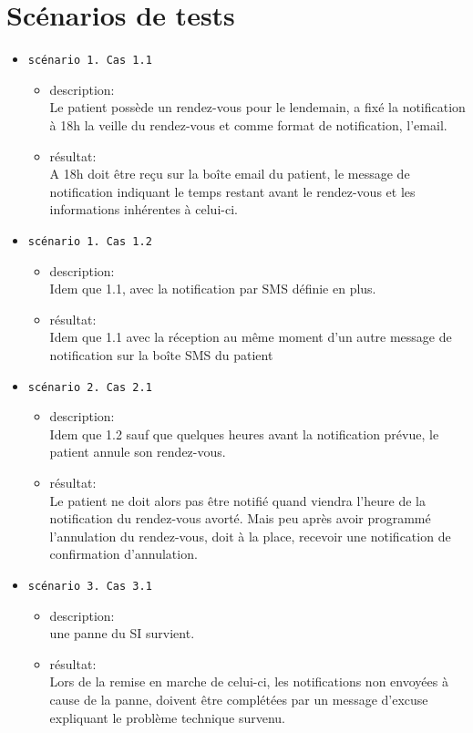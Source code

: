 	\section{Scénarios de tests}
	\begin{itemize}
		\item[] \texttt{scénario 1. Cas 1.1}
			\begin{itemize}
				\item description:  \\
					Le patient possède un rendez-vous pour le lendemain, a fixé
					la notification à 18h la veille du rendez-vous et comme
					format de notification, l'email.
				\item résultat: \\
					A 18h doit être reçu sur la boîte email du patient, le
					message de notification indiquant le temps restant avant le
					rendez-vous et les informations inhérentes à celui-ci.
			\end{itemize}
		\item[] \texttt{scénario 1. Cas 1.2}
			\begin{itemize}
				\item description:  \\
					Idem que 1.1, avec la notification par SMS définie en plus. 
				\item résultat: \\
					Idem que 1.1 avec la réception au même moment d’un autre
					message de notification sur la boîte SMS du patient
			\end{itemize}
		\item[] \texttt{scénario 2. Cas 2.1}
			\begin{itemize}
				\item description:\\
					Idem que 1.2 sauf que quelques heures avant la notification
					prévue, le patient annule son rendez-vous.
				\item résultat: \\
					Le patient ne doit alors pas être notifié quand viendra
					l'heure de la notification du rendez-vous avorté. 
					Mais peu après avoir programmé l'annulation du rendez-vous,
					doit à la place, recevoir une notification de confirmation
					d’annulation.
			\end{itemize}
		\item[] \texttt{scénario 3. Cas 3.1}
			\begin{itemize}
				\item description:\\
					une panne du SI survient.
				\item résultat: \\
					Lors de la remise en marche de celui-ci, les notifications
					non envoyées à cause de la panne, doivent être complétées
					par un message d’excuse expliquant le problème technique
					survenu.
			\end{itemize}
	\end{itemize}
	\newpage

